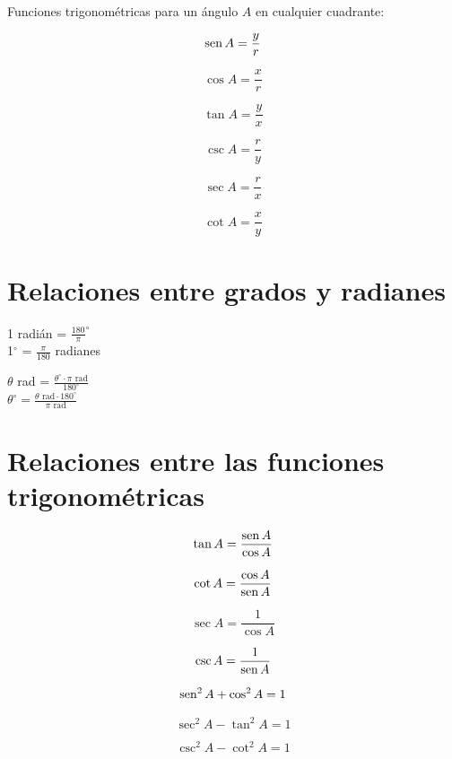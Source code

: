 Funciones trigonométricas para un ángulo $A$ en cualquier cuadrante:\\

\begin{minipage}[c]{0.5\textwidth}
$$ \operatorname{sen} A = \frac{y}{r} $$

$$ \cos A = \frac{x}{r} $$

$$ \tan A = \frac{y}{x} $$
\end{minipage}  \begin{minipage}[c]{0.5\textwidth}
$$ \csc A = \frac{r}{y} $$

$$ \sec A = \frac{r}{x} $$

$$ \cot A = \frac{x}{y} $$
\end{minipage} 

\section*{Relaciones entre grados y radianes}
\begin{minipage}[c]{0.5\textwidth}
1 radián = $\frac{180}{\pi} ^{\circ}$\\

1$^{\circ}$ = $\frac{\pi}{180}$ radianes\\
\end{minipage}  \begin{minipage}[c]{0.5\textwidth}
$\theta$ rad = $\frac{\theta^{\circ} \cdot \pi\,\,\mathrm{rad}}{180^{\circ}}$\\

$\theta^{\circ}=\frac{\theta \,\,\mathrm{rad} \cdot 180^{\circ}}{\pi\,\,\mathrm{rad}}$
\end{minipage} 

\section*{Relaciones entre las funciones trigonométricas}

\begin{minipage}[t]{0.5\textwidth}
$$ \tan A = \frac{\operatorname{sen} A}{\cos A} $$

$$ \cot A = \frac{\cos A}{\operatorname{sen} A}  $$

$$ \sec A = \frac{1}{\cos A}  $$

$$ \csc A = \frac{1}{\operatorname{sen} A} $$
\end{minipage}  \begin{minipage}[t]{0.5\textwidth}
$$ \operatorname{sen}^2 A + \cos^2 A = 1 $$

$$ \sec^2 A - \tan^2 A = 1 $$

$$ \csc^2 A - \cot^2 A = 1 $$
\end{minipage} 

